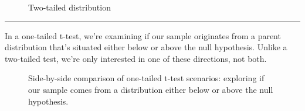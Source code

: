\documentclass[
  letterpaper,
  DIV=11,
  numbers=noendperiod]{scrreprt}
\begin{document}
\begin{figure}


\caption{\label{fig-5-5.twotailed}Two-tailed distribution}

\end{figure}%

\begin{center}\rule{0.5\linewidth}{0.5pt}\end{center}

In a one-tailed t-test, we're examining if our sample originates from a
parent distribution that's situated either below or above the null
hypothesis. Unlike a two-tailed test, we're only interested in one of
these directions, not both.

\begin{figure}


\caption{\label{fig-5-5.onetailed}Side-by-side comparison of one-tailed
t-test scenarios: exploring if our sample comes from a distribution
either below or above the null hypothesis.}

\end{figure}%
\end{document}
